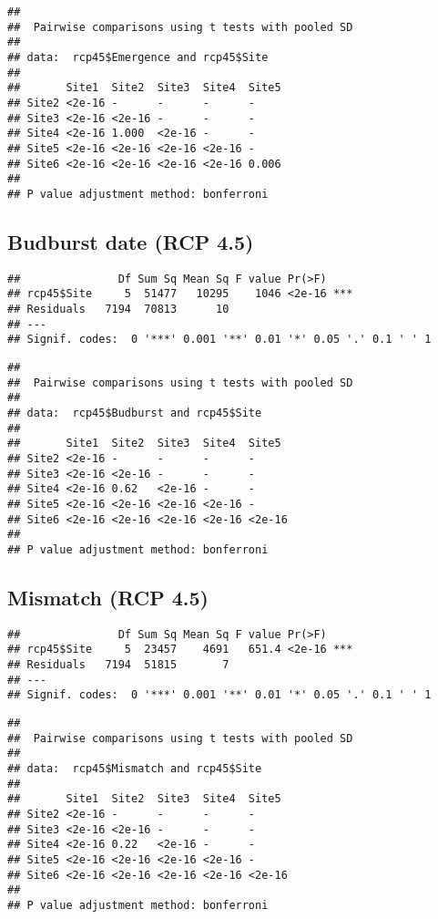 \documentclass[
]{article}
\begin{document}
\begin{verbatim}
## 
##  Pairwise comparisons using t tests with pooled SD 
## 
## data:  rcp45$Emergence and rcp45$Site 
## 
##       Site1  Site2  Site3  Site4  Site5
## Site2 <2e-16 -      -      -      -    
## Site3 <2e-16 <2e-16 -      -      -    
## Site4 <2e-16 1.000  <2e-16 -      -    
## Site5 <2e-16 <2e-16 <2e-16 <2e-16 -    
## Site6 <2e-16 <2e-16 <2e-16 <2e-16 0.006
## 
## P value adjustment method: bonferroni
\end{verbatim}

\hypertarget{budburst-date-rcp-4.5}{%
\subsection{Budburst date (RCP 4.5)}\label{budburst-date-rcp-4.5}}

\begin{verbatim}
##               Df Sum Sq Mean Sq F value Pr(>F)    
## rcp45$Site     5  51477   10295    1046 <2e-16 ***
## Residuals   7194  70813      10                   
## ---
## Signif. codes:  0 '***' 0.001 '**' 0.01 '*' 0.05 '.' 0.1 ' ' 1
\end{verbatim}

\begin{verbatim}
## 
##  Pairwise comparisons using t tests with pooled SD 
## 
## data:  rcp45$Budburst and rcp45$Site 
## 
##       Site1  Site2  Site3  Site4  Site5 
## Site2 <2e-16 -      -      -      -     
## Site3 <2e-16 <2e-16 -      -      -     
## Site4 <2e-16 0.62   <2e-16 -      -     
## Site5 <2e-16 <2e-16 <2e-16 <2e-16 -     
## Site6 <2e-16 <2e-16 <2e-16 <2e-16 <2e-16
## 
## P value adjustment method: bonferroni
\end{verbatim}

\hypertarget{mismatch-rcp-4.5}{%
\subsection{Mismatch (RCP 4.5)}\label{mismatch-rcp-4.5}}

\begin{verbatim}
##               Df Sum Sq Mean Sq F value Pr(>F)    
## rcp45$Site     5  23457    4691   651.4 <2e-16 ***
## Residuals   7194  51815       7                   
## ---
## Signif. codes:  0 '***' 0.001 '**' 0.01 '*' 0.05 '.' 0.1 ' ' 1
\end{verbatim}

\begin{verbatim}
## 
##  Pairwise comparisons using t tests with pooled SD 
## 
## data:  rcp45$Mismatch and rcp45$Site 
## 
##       Site1  Site2  Site3  Site4  Site5 
## Site2 <2e-16 -      -      -      -     
## Site3 <2e-16 <2e-16 -      -      -     
## Site4 <2e-16 0.22   <2e-16 -      -     
## Site5 <2e-16 <2e-16 <2e-16 <2e-16 -     
## Site6 <2e-16 <2e-16 <2e-16 <2e-16 <2e-16
## 
## P value adjustment method: bonferroni
\end{verbatim}
\end{document}

